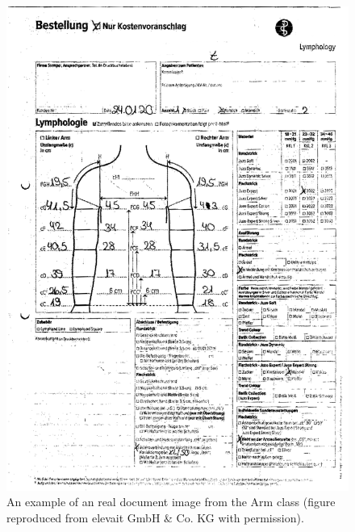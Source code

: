 \begin{figure}
  \centering
  \begin{minipage}[b]{0.4\textwidth}
    \includegraphics[width=\textwidth]{images/Introduction/ArmRealImage.png}
    \caption[An example of an real document image from the Arm class.]{An example of an real document image from the Arm class (figure reproduced from elevait GmbH \& Co. KG with permission). }
    \label{fig:realImageArm}
  \end{minipage}
  \hfill
  \begin{minipage}[b]{0.4\textwidth}

\end{minipage}
\end{figure}
